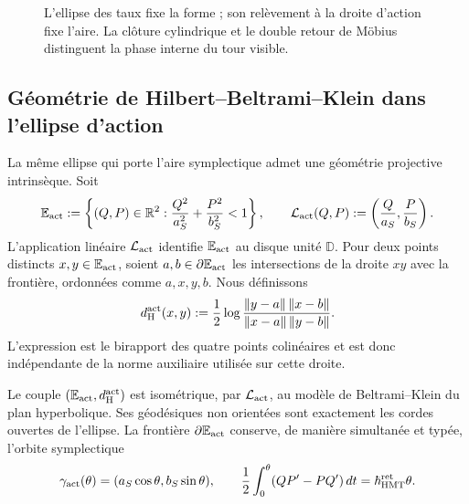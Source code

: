 \begin{figure}[htbp]
\centering
\resizebox{.98\textwidth}{!}{}
\caption{L'ellipse des taux fixe la forme ; son relèvement à la droite d'action fixe
l'aire. La clôture cylindrique et le double retour de Möbius distinguent la phase
interne du tour visible.}
\label{fig:elipse-accion-holonomia-rev8}
\end{figure}

\subsection{Géométrie de Hilbert--Beltrami--Klein dans l'ellipse d'action}
\label{sec:hilbert-beltrami-klein-elipse-accion}

La même ellipse qui porte l'aire symplectique admet une géométrie projective
intrinsèque. Soit
\[
 \mathbb E_{\rm act}
 :=\left\{(Q,P)\in\mathbb R^2:
 \frac{Q^2}{a_S^2}+\frac{P^2}{b_S^2}<1\right\},
 \qquad
 \mathcal L_{\rm act}(Q,P)
 :=\left(\frac{Q}{a_S},\frac{P}{b_S}\right).
\]
L'application linéaire \(\mathcal L_{\rm act}\) identifie
\(\mathbb E_{\rm act}\) au disque unité \(\mathbb D\). Pour deux points
distincts \(x,y\in\mathbb E_{\rm act}\), soient \(a,b\in\partial
\mathbb E_{\rm act}\) les intersections de la droite \(xy\) avec la frontière,
ordonnées comme \(a,x,y,b\). Nous définissons
\begin{equation}
 d_{\rm H}^{\rm act}(x,y)
 :=\frac12\log
 \frac{\lVert y-a\rVert\,\lVert x-b\rVert}
      {\lVert x-a\rVert\,\lVert y-b\rVert}.
 \label{eq:distancia-hilbert-elipse-accion}
\end{equation}
L'expression est le birapport des quatre points colinéaires et est donc
indépendante de la norme auxiliaire utilisée sur cette droite.

\begin{proposition}
\label{prop:beltrami-klein-elipse-accion}
Le couple \((\mathbb E_{\rm act},d_{\rm H}^{\rm act})\) est isométrique, par
\(\mathcal L_{\rm act}\), au modèle de Beltrami--Klein du plan hyperbolique.
Ses géodésiques non orientées sont exactement les cordes ouvertes de
l'ellipse. La frontière \(\partial\mathbb E_{\rm act}\) conserve, de manière
simultanée et typée, l'orbite symplectique
\[
 \gamma_{\rm act}(\theta)
 =(a_S\cos\theta,b_S\sin\theta),
 \qquad
 \frac12\int_0^\theta(QP'-PQ')\,dt
 =\hbar_{\rm HMT}^{\rm ret}\theta.
\]
\end{proposition}

